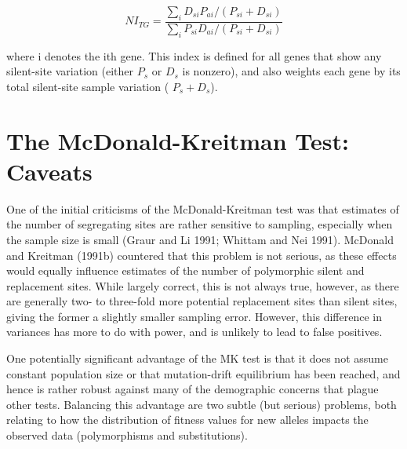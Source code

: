 \documentclass{article}
\begin{document}
\begin{equation}
NI_{TG}=\frac{\sum_{i}D_{si}P_{ai}/(P_{si}+D_{si})}{\sum_{i}P_{si}D_{ai}/(P_{si}+D_{si})}
\tag{10.6c}
\label{eq:10_6c}
\end{equation}

where i denotes the ith gene. This index is defined for all genes that show any silent-site variation (either  $ P_s $ or  $ D_s $ is nonzero), and also weights each gene by its total silent-site sample variation ( $ P_s + D_s $).

\section{The McDonald-Kreitman Test: Caveats}
One of the initial criticisms of the McDonald-Kreitman test was that estimates of the number of segregating sites are rather sensitive to sampling, especially when the sample size is small (Graur and Li 1991; Whittam and Nei 1991). McDonald and Kreitman (1991b) countered that this problem is not serious, as these effects would equally influence estimates of the number of polymorphic silent and replacement sites. While largely correct, this is not always true, however, as there are generally two- to three-fold more potential replacement sites than silent sites, giving the former a slightly smaller sampling error. However, this difference in variances has more to do with power, and is unlikely to lead to false positives.

One potentially significant advantage of the MK test is that it does not assume constant population size or that mutation-drift equilibrium has been reached, and hence is rather robust against many of the demographic concerns that plague other tests. Balancing this advantage are two subtle (but serious) problems, both relating to how the distribution of fitness values for new alleles impacts the observed data (polymorphisms and substitutions).
\end{document}
